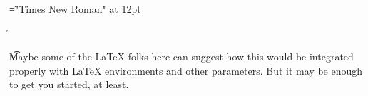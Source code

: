 \font\t="Times New Roman" at 12pt
 \r\n{}
\t Maybe some of the LaTeX folks here can suggest how this would be integrated properly with LaTeX environments and other parameters. But it may be enough to get you started, at least. 


\bye
